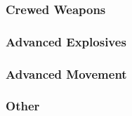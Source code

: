 

\subsubsection*{Crewed Weapons}



\subsubsection*{Advanced Explosives}



\subsubsection*{Advanced Movement}



\subsubsection*{Other}


